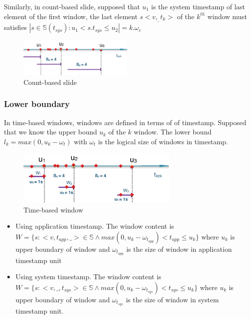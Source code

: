Similarly, in count-based slide, supposed that $u_1$ is the system timestamp of last element of the first window, the last element $s<v,_,t_k>$ of the $k^{th}$ window must satisfies $|{s \in \mathbb{S}(t_{sys}): u_1 < s.t_{sys} \leq u_2}| = k.\omega_c$

\begin{figure}[htbp!] 
\centering    
\includegraphics[width=0.5\textwidth]{countbased_slide}
\caption{Count-based slide}
\label{fig:countbased_slide}
\end{figure}

\subsubsection{Lower boundary}

In time-based windows, windows are defined in terms of of timestamp. Supposed that we know the upper bound $u_k$ of the $k$ window. The lower bound $l_k = max(0, u_k - \omega_t)$ with $\omega_t$ is the logical size of windows in timestamp.

\begin{figure}[htbp!] 
\centering    
\includegraphics[width=0.7\textwidth]{timebased_window}
\caption{Time-based window}
\label{fig:timebased_window}
\end{figure}

\begin{itemize}
\item Using application timestamp. The window content is $W = \{s:<v, t_{app},\_> \in \mathbb{S} \wedge max(0, u_k - \omega_{t_{app}}) < t_{app} \leq u_k\}$ where $u_k$ is upper boundary of window and $\omega_{t_{app}}$ is the size of window in application timestamp unit


\item Using system timestamp. The window content is $W = \{s:<v,\_, t_{sys}> \in \mathbb{S} \wedge max (0, u_k - \omega_{t_{sys}}) < t_{sys} \leq u_k\}$ where $u_k$ is upper boundary of window and $\omega_{t_{sys}}$ is the size of window in system timestamp unit. 
\end{itemize} 


